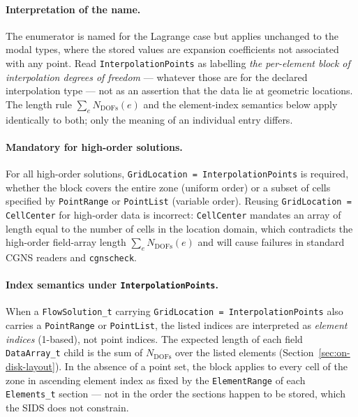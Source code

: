 \documentclass[11pt,letterpaper]{article}
\begin{document}
\paragraph{Interpretation of the name.}
The enumerator is named for the Lagrange case but applies unchanged to the modal types, where
the stored values are expansion coefficients not associated with any point.  Read
\texttt{InterpolationPoints} as labelling \emph{the per-element block of interpolation degrees
of freedom} --- whatever those are for the declared interpolation type --- not as an assertion
that the data lie at geometric locations.  The length rule $\sum_e N_\mathrm{DOFs}(e)$ and the
element-index semantics below apply identically to both; only the meaning of an individual
entry differs.

\paragraph{Mandatory for high-order solutions.}
For all high-order solutions, \texttt{GridLocation = InterpolationPoints} is required,
whether the block covers the entire zone (uniform order) or a subset of cells
specified by \texttt{PointRange} or \texttt{PointList} (variable order).  Reusing
\texttt{GridLocation = CellCenter} for high-order data is incorrect: \texttt{CellCenter}
mandates an array of length equal to the number of cells in the location domain,
which contradicts the high-order field-array length
$\sum_e N_\mathrm{DOFs}(e)$ and will cause failures in standard CGNS readers and
\texttt{cgnscheck}.

\paragraph{Index semantics under \texttt{InterpolationPoints}.}
When a \texttt{FlowSolution\_t} carrying \texttt{GridLocation = InterpolationPoints}
also carries a \texttt{PointRange} or \texttt{PointList}, the listed indices are
interpreted as \emph{element indices} (1-based), not point indices.  The expected
length of each field \texttt{DataArray\_t} child is the sum of $N_\mathrm{DOFs}$ over
the listed elements (Section~\ref{sec:on-disk-layout}).  In the absence of a point
set, the block applies to every cell of the zone in ascending element index as
fixed by the \texttt{ElementRange} of each \texttt{Elements\_t} section --- not in
the order the sections happen to be stored, which the SIDS does not constrain.
\end{document}
